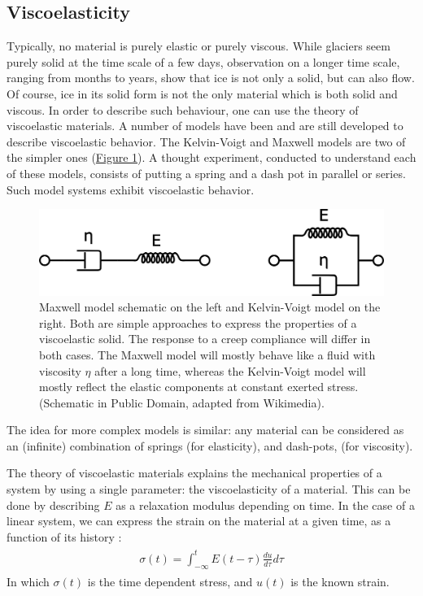 \documentclass[A4paperpaper,11pt,english]{sphinxmanual}
\begin{document}
\subsection{Viscoelasticity}
\label{index-latex:viscoelasticity}
Typically, no material is purely elastic or purely viscous. While glaciers
seem purely solid at the time scale of a few days, observation on a longer time
scale, ranging from months to years, show that ice is not only a
solid, but can also flow. Of course, ice in its solid form is not the only
material which is both solid and viscous. In order to describe such
behaviour, one can use the theory of viscoelastic materials.  A number of models have
been and are still developed to describe viscoelastic behavior. The
Kelvin-Voigt and Maxwell models are two of the simpler ones (\hyperref[index-latex:fig-mkv]{Figure  \ref*{index-latex:fig-mkv}}). A thought
experiment, conducted to understand each of these models, consists of putting a spring and a dash pot
in parallel or series. Such model systems exhibit viscoelastic behavior.
\begin{figure}[htbp]
\centering
\capstart

\includegraphics[width=0.700\linewidth]{MKV.png}
\caption{Maxwell model schematic on the left and Kelvin-Voigt model on the right.
Both are simple approaches to express the properties of a viscoelastic
solid. The response to a creep compliance will differ in both cases. The Maxwell
model will mostly behave like a fluid with viscosity \(\eta\) after a
long time, whereas the Kelvin-Voigt model will mostly reflect the elastic
components at constant exerted stress. (Schematic in Public Domain, adapted
from Wikimedia).}\label{index-latex:fig-mkv}\end{figure}

The idea for more complex models is similar: any material can be considered as an
(infinite) combination of springs (for elasticity), and dash-pots, (for viscosity).

The theory of viscoelastic materials explains the mechanical properties of a system by
using a single parameter: the viscoelasticity of a material. This can
be done by describing \(E\) as a relaxation modulus depending on time.  In
the case of a linear system, we can express the strain on the material at a given
time, as a function of its history :
\label{index-latex:equation-strain}\begin{gather}
\begin{split}\sigma (t)  = \int_{-\infty}^t E(t-\tau) \frac{du}{d\tau} d\tau\end{split}\label{index-latex-strain}
\end{gather}
In which \(\sigma(t)\) is the time dependent stress, and \(u(t)\) is
the known strain.
\end{document}
